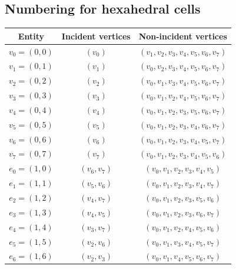 \newpage

\subsection{Numbering for hexahedral cells}

\vspace{-0.5cm}
\begin{table}[H]
\small
\linespread{1.2}\selectfont
  \begin{center}
    \begin{tabular}{|c|c|c|}
      \hline
      Entity & Incident vertices & Non-incident vertices \\
      \hline
      \hline
      $v_0 = (0, 0)$ & $(v_0)$ & $(v_1, v_2, v_3, v_4, v_5, v_6, v_7)$ \\
      \hline
      $v_1 = (0, 1)$ & $(v_1)$ & $(v_0, v_2, v_3, v_4, v_5, v_6, v_7)$ \\
      \hline
      $v_2 = (0, 2)$ & $(v_2)$ & $(v_0, v_1, v_3, v_4, v_5, v_6, v_7)$ \\
      \hline
      $v_3 = (0, 3)$ & $(v_3)$ & $(v_0, v_1, v_2, v_4, v_5, v_6, v_7)$ \\
      \hline
      $v_4 = (0, 4)$ & $(v_4)$ & $(v_0, v_1, v_2, v_3, v_5, v_6, v_7)$ \\
      \hline
      $v_5 = (0, 5)$ & $(v_5)$ & $(v_0, v_1, v_2, v_3, v_4, v_6, v_7)$ \\
      \hline
      $v_6 = (0, 6)$ & $(v_6)$ & $(v_0, v_1, v_2, v_3, v_4, v_5, v_7)$ \\
      \hline
      $v_7 = (0, 7)$ & $(v_7)$ & $(v_0, v_1, v_2, v_3, v_4, v_5, v_6)$ \\
      \hline
      $e_0 = (1, 0)$ & $(v_6, v_7)$ & $(v_0, v_1, v_2, v_3, v_4, v_5)$ \\
      \hline
      $e_1 = (1, 1)$ & $(v_5, v_6)$ & $(v_0, v_1, v_2, v_3, v_4, v_7)$ \\
      \hline
      $e_2 = (1, 2)$ & $(v_4, v_7)$ & $(v_0, v_1, v_2, v_3, v_5, v_6)$ \\
      \hline
      $e_3 = (1, 3)$ & $(v_4, v_5)$ & $(v_0, v_1, v_2, v_3, v_6, v_7)$ \\
      \hline
      $e_4 = (1, 4)$ & $(v_3, v_7)$ & $(v_0, v_1, v_2, v_4, v_5, v_6)$ \\
      \hline
      $e_5 = (1, 5)$ & $(v_2, v_6)$ & $(v_0, v_1, v_3, v_4, v_5, v_7)$ \\
      \hline
      $e_6 = (1, 6)$ & $(v_2, v_3)$ & $(v_0, v_1, v_4, v_5, v_6, v_7)$ \\

\end{tabular}
\end{center}
\end{table}
